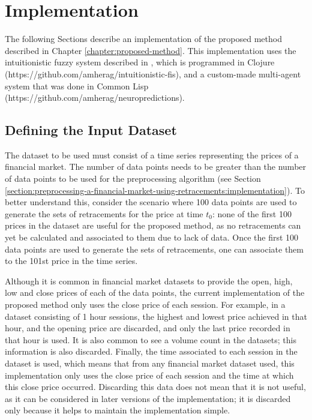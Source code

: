 \chapter{Implementation}
\label{chapter:implementation}

The following Sections describe an implementation of the proposed method
described in Chapter \ref{chapter:proposed-method}. This implementation uses the
intuitionistic fuzzy system described in \cite{Hernandez-Aguila2017}, which is
programmed in Clojure (https://github.com/amherag/intuitionistic-fis), and a
custom-made multi-agent system that was done in Common Lisp
(https://github.com/amherag/neuropredictions).

\section{Defining the Input Dataset}
\label{section:defining-the-input-dataset}

The dataset to be used must consist of a time series representing the prices
of a financial market. The number of data points needs to be greater than the
number of data points to be used for the preprocessing algorithm (see Section
\ref{section:preprocessing-a-financial-market-using-retracements:implementation}). To
better understand this, consider the scenario where 100 data points are used to
generate the sets of retracements for the price at time $t_0$: none of the first
100 prices in the dataset are useful for the proposed method, as no retracements
can yet be calculated and associated to them due to lack of data. Once the first
100 data points are used to generate the sets of retracements, one can associate
them to the 101st price in the time series.

Although it is common in financial market datasets to provide the open, high,
low and close prices of each of the data points, the current implementation of the
proposed method only uses the close price of each session. For example, in a
dataset consisting of 1 hour sessions, the highest and lowest price achieved in
that hour, and the opening price are discarded, and only the last price recorded
in that hour is used. It is also common to see a volume count in the datasets;
this information is also discarded. Finally, the time associated to each session
in the dataset is used, which means that from any financial market dataset used,
this implementation only uses the close price of each session and the time at
which this close price occurred. Discarding this data does not mean that it is
not useful, as it can be considered in later versions of the implementation;
it is discarded only because it helps to maintain the implementation simple.

